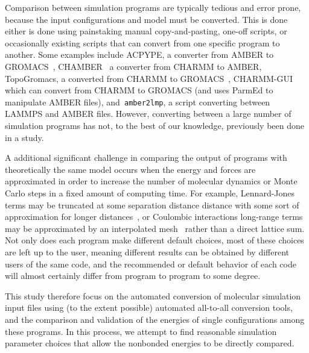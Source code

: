 Comparison between simulation programs are typically tedious and error
prone, because the input configurations and model must be converted.
This is done either is done using painstaking manual copy-and-pasting,
one-off scripts, or occasionally existing scripts that can convert
from one specific program to another.  Some examples include ACPYPE, a
converter from AMBER to GROMACS~\citep{sousa_da_silva_acpype_2012},
CHAMBER~\citep{crowley_chamber:_2009} a converter from CHARMM to
AMBER, TopoGromacs, a converted from CHARMM to
GROMACS~\citep{vermaas_topogromacs:_2016},
CHARMM-GUI~\citep{lee_charmm-gui_2016} which can convert from CHARMM
to GROMACS (and uses ParmEd to manipulate AMBER files), and{\tt
  amber2lmp}, a script converting between LAMMPS and AMBER
files. However, converting between a large number of simulation
programs has not, to the best of our knowledge, previously been done
in a study.


A additional significant challenge in comparing the output of programs
with theoretically the same model occurs when the energy and forces
are approximated in order to increase the number of molecular dynamics
or Monte Carlo steps in a fixed amount of computing time. For example,
Lennard-Jones terms may be truncated at some separation distance
distance with some sort of approximation for longer
distances~\citep{AllenAndTildesley,shirts_accurate_2007,wu_isotropic_2005},
or Coulombic interactions long-range terms may be approximated by an
interpolated mesh~\citep{essmann_smooth_1995} rather than a direct
lattice sum.  Not only does each program make different default
choices, most of these choices are left up to the user, meaning
different results can be obtained by different users of the same code,
and the recommended or default behavior of each code will almost
certainly differ from program to program to some degree.

This study therefore focus on the automated conversion of molecular
simulation input files using (to the extent possible) automated
all-to-all conversion tools, and the comparison and validation of the
energies of single configurations among these programs. In this
process, we attempt to find reasonable simulation parameter choices
that allow the nonbonded energies to be directly compared.

